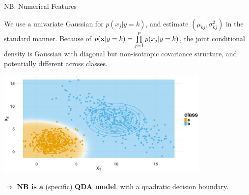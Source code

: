 \documentclass[11pt,compress,t,notes=noshow, xcolor=table]{beamer}
\begin{document}
\begin{vbframe}{NB: Numerical Features}

We use a univariate Gaussian for $p(x_j | y=k)$, and estimate $(\mu_{kj}, \sigma^2_{kj})$ in the standard manner. Because of $p(\mathbf{x} | y= k) = \prod\limits_{j=1}^p p(x_j|y = k)$, the joint conditional density is Gaussian with diagonal but non-isotropic covariance structure, and potentially different across classes.

\begin{center}
\includegraphics[width=0.79\textwidth, clip = true, trim = {0 20 0 20}]{figure/nb-db.png} 
\end{center}

$\Rightarrow$  \textbf{NB is a} (specific) \textbf{QDA model}, with a quadratic decision boundary.

\end{vbframe}
\end{document}
